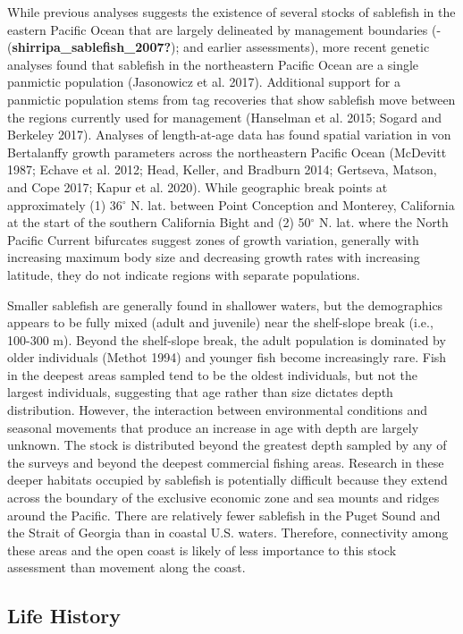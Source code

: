 \documentclass[
]{scrartcl}
\begin{document}
While previous analyses suggests the existence of several stocks of
sablefish in the eastern Pacific Ocean that are largely delineated by
management boundaries (-(\textbf{shirripa\_sablefish\_2007?}); and
earlier assessments), more recent genetic analyses found that sablefish
in the northeastern Pacific Ocean are a single panmictic population
(Jasonowicz et al. 2017). Additional support for a panmictic population
stems from tag recoveries that show sablefish move between the regions
currently used for management (Hanselman et al. 2015; Sogard and
Berkeley 2017). Analyses of length-at-age data has found spatial
variation in von Bertalanffy growth parameters across the northeastern
Pacific Ocean (McDevitt 1987; Echave et al. 2012; Head, Keller, and
Bradburn 2014; Gertseva, Matson, and Cope 2017; Kapur et al. 2020).
While geographic break points at approximately (1) 36\(^\circ\) N. lat.
between Point Conception and Monterey, California at the start of the
southern California Bight and (2) 50\(^\circ\) N. lat. where the North
Pacific Current bifurcates suggest zones of growth variation, generally
with increasing maximum body size and decreasing growth rates with
increasing latitude, they do not indicate regions with separate
populations.

Smaller sablefish are generally found in shallower waters, but the
demographics appears to be fully mixed (adult and juvenile) near the
shelf-slope break (i.e., 100-300 m). Beyond the shelf-slope break, the
adult population is dominated by older individuals (Methot 1994) and
younger fish become increasingly rare. Fish in the deepest areas sampled
tend to be the oldest individuals, but not the largest individuals,
suggesting that age rather than size dictates depth distribution.
However, the interaction between environmental conditions and seasonal
movements that produce an increase in age with depth are largely
unknown. The stock is distributed beyond the greatest depth sampled by
any of the surveys and beyond the deepest commercial fishing areas.
Research in these deeper habitats occupied by sablefish is potentially
difficult because they extend across the boundary of the exclusive
economic zone and sea mounts and ridges around the Pacific. There are
relatively fewer sablefish in the Puget Sound and the Strait of Georgia
than in coastal U.S. waters. Therefore, connectivity among these areas
and the open coast is likely of less importance to this stock assessment
than movement along the coast.

\subsection{Life History}\label{life-history}
\end{document}
